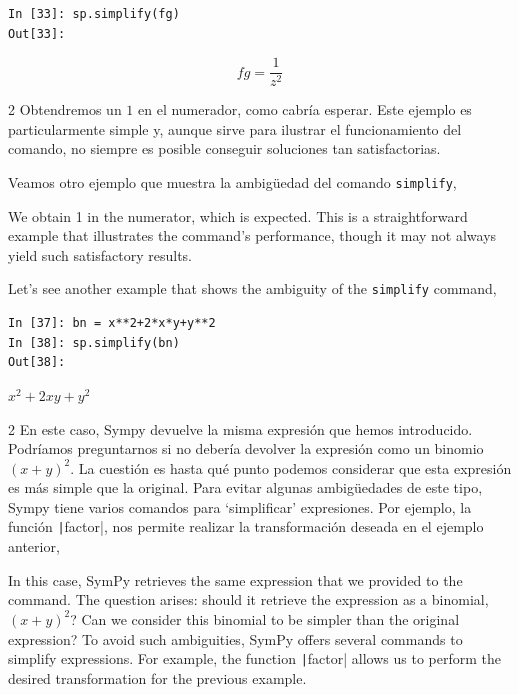 \begin{center}
	\begin{minipage}{.25\textwidth}
		\begin{verbatim}
In [33]: sp.simplify(fg)
Out[33]: 
		\end{verbatim}
	\end{minipage}
	\begin{equation*}
		fg = \frac{1}{z^2}
	\end{equation*}
\end{center}
\begin{paracol}{2}
Obtendremos un $1$ en el numerador, como cabría esperar. Este ejemplo es particularmente simple y, aunque sirve para ilustrar el funcionamiento del comando, no siempre es posible conseguir soluciones tan satisfactorias.

Veamos otro ejemplo que muestra la ambigüedad del comando \texttt{simplify},

\switchcolumn
We obtain 1 in the numerator, which is expected. This is a straightforward example that illustrates the command's performance, though it may not always yield such satisfactory results.

Let's see another example that shows the ambiguity of the \texttt{simplify} command,
\end{paracol}
\begin{center}
	\begin{minipage}{.25\textwidth}
		\begin{verbatim}
In [37]: bn = x**2+2*x*y+y**2
In [38]: sp.simplify(bn)
Out[38]:
		\end{verbatim}
		$x^2+2xy+y^2$
	\end{minipage}
\end{center}
\begin{paracol}{2}
En este caso, Sympy devuelve la misma expresión que hemos introducido. Podríamos preguntarnos si no debería devolver la expresión como un binomio $(x+y)^2$. La cuestión es hasta qué punto podemos considerar que esta expresión es más simple que la original. Para evitar algunas ambigüedades de este tipo, Sympy tiene varios comandos para `simplificar' expresiones. Por ejemplo, la función \texttt|factor|, nos permite realizar la transformación deseada en el ejemplo anterior,

\switchcolumn
In this case, SymPy retrieves the same expression that we provided to the command. The question arises: should it retrieve the expression as a binomial, \((x+y)^2\)? Can we consider this binomial to be simpler than the original expression? To avoid such ambiguities, SymPy offers several commands to simplify expressions. For example, the function \texttt|factor| allows us to perform the desired transformation for the previous example.
\end{paracol}
